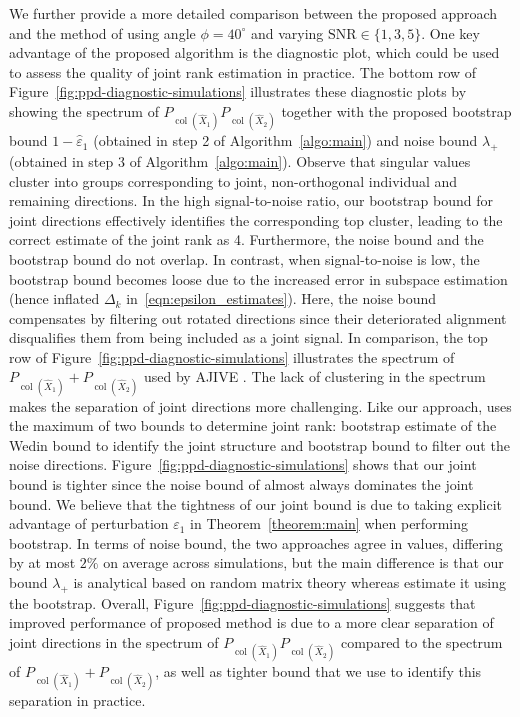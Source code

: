 \documentclass{amsart}
\DeclareMathOperator*{\col}{col}
\begin{document}
 We further provide a more detailed comparison between the proposed approach and the method of \citet{feng2018angle} using angle $\phi =40^\circ$ and varying $\mathrm{SNR}\in\{1, 3, 5\}$. One key advantage of the proposed algorithm is the diagnostic plot, which could be used to assess the quality of joint rank estimation in practice. 
The bottom row of Figure~\ref{fig:ppd-diagnostic-simulations} illustrates these diagnostic plots by showing the spectrum of $P_{\col(\widehat{X}_1)}P_{\col(\widehat{X}_2)}$ together with the proposed bootstrap bound  $1-\widehat{\varepsilon}_1$ (obtained in step 2 of Algorithm~\ref{algo:main}) and noise bound $\lambda_+$ (obtained in step 3 of Algorithm~\ref{algo:main}). Observe that singular values cluster into groups corresponding to joint, non-orthogonal individual and remaining directions. In the high signal-to-noise ratio, our bootstrap bound for joint directions effectively identifies the corresponding top cluster, leading to the correct estimate of the joint rank as 4.
Furthermore, the noise bound and the bootstrap bound do not overlap. In contrast, when signal-to-noise is low, the bootstrap bound becomes loose due to the increased error in subspace estimation (hence inflated $\Delta_k$ in~\eqref{eqn:epsilon_estimates}). Here, the noise bound compensates by filtering out rotated directions since their deteriorated alignment disqualifies them from being included as a joint signal.  In comparison, the top row of Figure~\ref{fig:ppd-diagnostic-simulations} illustrates the spectrum of $P_{\col(\widehat{X}_1)} + P_{\col(\widehat{X}_2)}$ used by AJIVE \citep{feng2018angle}.  The lack of clustering in the spectrum makes the separation of joint directions more challenging. Like our approach, \citet{feng2018angle} uses the maximum of two bounds to determine joint rank: bootstrap estimate of the Wedin bound to identify the joint structure and bootstrap bound to filter out the noise directions. Figure~\ref{fig:ppd-diagnostic-simulations} shows that our joint bound is tighter since the noise bound of \citet{feng2018angle} almost always dominates the joint bound. We believe that the tightness of our joint bound is due to taking explicit advantage of perturbation $\varepsilon_1$ in Theorem~\ref{theorem:main} when performing bootstrap. 
In terms of noise bound, the two approaches agree in values, differing by at most $2\%$ on average across simulations, but the main difference is that our bound $\lambda_+$ is analytical based on random matrix theory whereas \citet{feng2018angle} estimate it using the bootstrap. Overall, Figure~\ref{fig:ppd-diagnostic-simulations} suggests that improved performance of proposed method is due to a more clear separation of joint directions in the spectrum of $P_{\col(\widehat{X}_1)}P_{\col(\widehat{X}_2)}$ compared to the spectrum of $P_{\col(\widehat{X}_1)} + P_{\col(\widehat{X}_2)}$, as well as tighter bound that we use to identify this separation in practice.
\end{document}
